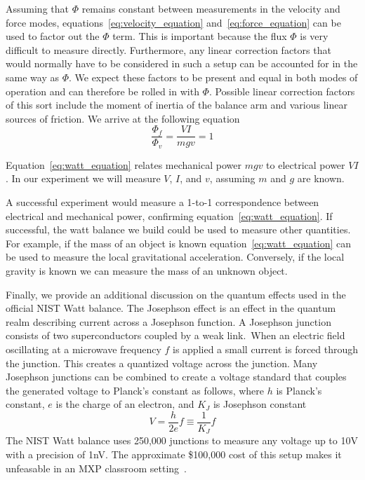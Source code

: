 \documentclass[aps,prstab,reprint,12pt]{revtex4-1}
\begin{document}
Assuming that $\Phi$ remains constant between measurements in the velocity and force modes, equations~\ref{eq:velocity_equation} and~\ref{eq:force_equation} can be used to factor out the $\Phi$ term. This is important because the flux $\Phi$ is very difficult to measure directly. Furthermore, any linear correction factors that would normally have to be considered in such a setup can be accounted for in the same way as $\Phi$. We expect these factors to be present and equal in both modes of operation and can therefore be rolled in with $\Phi$. Possible linear correction factors of this sort include the moment of inertia of the balance arm and various linear sources of friction. We arrive at the following equation
\begin{equation}\label{eq:watt_equation}
    \frac{\Phi_f}{\Phi_v} = \frac{VI}{mgv} = 1
\end{equation}

Equation~\ref{eq:watt_equation} relates mechanical power $mgv$ to electrical power $VI$. In our experiment we will measure $V$, $I$, and $v$, assuming $m$ and $g$ are known.

A successful experiment would measure a 1-to-1 correspondence between electrical and mechanical power, confirming equation~\ref{eq:watt_equation}. If successful, the watt balance we build could be used to measure other quantities. For example, if the mass of an object is known equation~\ref{eq:watt_equation} can be used to measure the local gravitational acceleration. Conversely, if the local gravity is known we can measure the mass of an unknown object.

Finally, we provide an additional discussion on the quantum effects used in the official NIST Watt balance. 
The Josephson effect is an effect in the quantum realm describing current across a Josephson function. A Josephson junction consists of two superconductors coupled by a weak link.\ 
When an electric field oscillating at a microwave frequency $f$ is applied a small current is forced through the junction. This creates a quantized voltage across the junction.
Many Josephson junctions can be combined to create a voltage standard that couples the generated voltage to Planck's constant as follows, where $h$ is Planck's constant, $e$ is the charge of an electron, and $K_J$ is Josephson constant
\begin{equation}\label{eq:josephson}
    V=\frac{h}{2e}f \equiv \frac{1}{K_J} f
\end{equation}
The NIST Watt balance uses 250,000 junctions to measure any voltage up to 10\si{V} with a precision of 1\si{nV}. The approximate \$100,000 cost of this setup makes it unfeasable in an MXP classroom setting~\cite{Chao2015}.
\newpage
\end{document}
